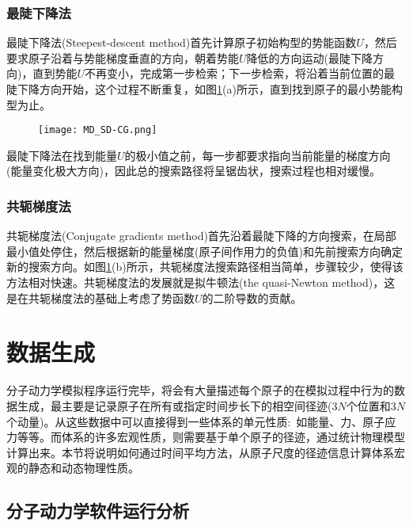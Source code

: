 \subsubsection{最陡下降法}
最陡下降法\textrm{(Steepest-descent method)}首先计算原子初始构型的势能函数$U$，然后要求原子沿着与势能梯度垂直的方向，朝着势能$U$降低的方向运动(最陡下降方向)，直到势能$U$不再变小，完成第一步检索；下一步检索，将沿着当前位置的最陡下降方向开始，这个过程不断重复，如图\ref{MD_SD-CG}\textrm{(a)}所示，直到找到原子的最小势能构型为止。
\begin{figure}[h!]
\centering
\vspace*{-0.1in}
\texttt{[image: MD\_SD-CG.png]}
\caption{\fontsize{7.2pt}{4.2pt}}%
\label{MD_SD-CG}
\end{figure}
最陡下降法在找到能量$U$的极小值之前，每一步都要求指向当前能量的梯度方向(能量变化极大方向)，因此总的搜索路径将呈锯齿状，搜索过程也相对缓慢。
\subsubsection{共轭梯度法}
共轭梯度法\textrm{(Conjugate gradients method)}首先沿着最陡下降的方向搜索，在局部最小值处停住，然后根据新的能量梯度(原子间作用力的负值)和先前搜索方向确定新的搜索方向。如图\ref{MD_SD-CG}(b)所示，共轭梯度法搜索路径相当简单，步骤较少，使得该方法相对快速。共轭梯度法的发展就是拟牛顿法\textrm{(the quasi-Newton method)}，这是在共轭梯度法的基础上考虑了势函数$U$的二阶导数的贡献。

\section{数据生成}
分子动力学模拟程序运行完毕，将会有大量描述每个原子的在模拟过程中行为的数据生成，最主要是记录原子在所有或指定时间步长下的相空间径迹(3$N$个位置和3$N$个动量)。从这些数据中可以直接得到一些体系的单元性质:~如能量、力、原子应力等等。而体系的许多宏观性质，则需要基于单个原子的径迹，通过统计物理模型计算出来。本节将说明如何通过时间平均方法，从原子尺度的径迹信息计算体系宏观的静态和动态物理性质。
\subsection{分子动力学软件运行分析}

